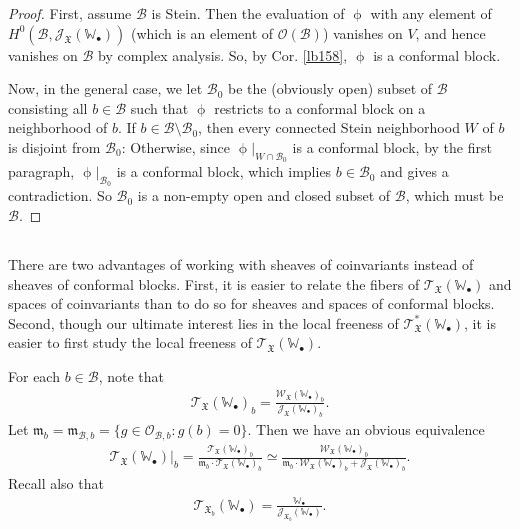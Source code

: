 \documentclass[11pt,b5paper,notitlepage]{article}
\theoremstyle{definition}
\theoremstyle{plain}
\newcommand{\fk}{\mathfrak}
\newcommand{\mc}{\mathcal}
\newcommand{\scr}{\mathscr}
\newcommand{\blt}{\bullet}
\newcommand{\Wbb}{\mathbb W}
\numberwithin{equation}{section}
\begin{document}
\begin{proof}
First, assume $\mc B$ is Stein. Then the evaluation of $\upphi$ with any element of $H^0(\mc B,\scr J_{\fk X}(\Wbb_\blt))$ (which is an element of $\scr O(\mc B)$) vanishes on $V$, and hence vanishes on $\mc B$ by complex analysis. So, by Cor. \ref{lb158}, $\upphi$ is a conformal block.

Now, in the general case, we let $\mc B_0$ be the (obviously open) subset of $\mc B$ consisting all $b\in\mc B$ such that $\upphi$ restricts to a conformal block on a neighborhood of $b$. If $b\in\mc B\setminus\mc B_0$, then  every connected Stein neighborhood $W$ of $b$ is disjoint from $\mc B_0$: Otherwise, since $\upphi|_{W\cap\mc B_0}$ is a conformal block, by the first paragraph, $\upphi|_{\mc B_0}$ is a conformal block, which implies $b\in\mc B_0$ and gives a contradiction. So $\mc B_0$ is a non-empty open and closed subset of $\mc B$, which must be $\mc B$. 
\end{proof}






\subsection{}



There are two advantages of working with sheaves of coinvariants instead of sheaves of conformal blocks. First, it is easier to relate the fibers of $\scr T_{\fk X}(\Wbb_\blt)$ and spaces of coinvariants than to do so for sheaves and spaces of conformal blocks. Second, though our ultimate interest lies in  the local freeness of $\scr T_{\fk X}^*(\Wbb_\blt)$, it is easier to first study the local freeness of $\scr T_{\fk X}(\Wbb_\blt)$.

For each $b\in\mc B$, note that
\begin{align*}
\scr T_{\fk X}(\Wbb_\blt)_b=\frac{\scr W_{\fk X}(\Wbb_\blt)_b}{\scr J_{\fk X}(\Wbb_\blt)_b}.
\end{align*}
Let $\fk m_b=\fk m_{\mc B,b}=\{g\in\scr O_{\mc B,b}:g(b)=0\}$. Then we have an obvious equivalence
\begin{align}
\scr T_{\fk X}(\Wbb_\blt)\big|_b=\frac{\scr T_{\fk X}(\Wbb_\blt)_b}{\fk m_b\cdot \scr T_{\fk X}(\Wbb_\blt)_b}\simeq \frac{\scr W_{\fk X}(\Wbb_\blt)_b}{\fk m_b\cdot \scr W_{\fk X}(\Wbb_\blt)_b+ \scr J_{\fk X}(\Wbb_\blt)_b}.
\end{align}
Recall also that
\begin{align}
\scr T_{\fk X_b}(\Wbb_\blt)=\frac{\Wbb_\blt}{\scr J_{\fk X_b}(\Wbb_\blt)}.
\end{align}
\end{document}
